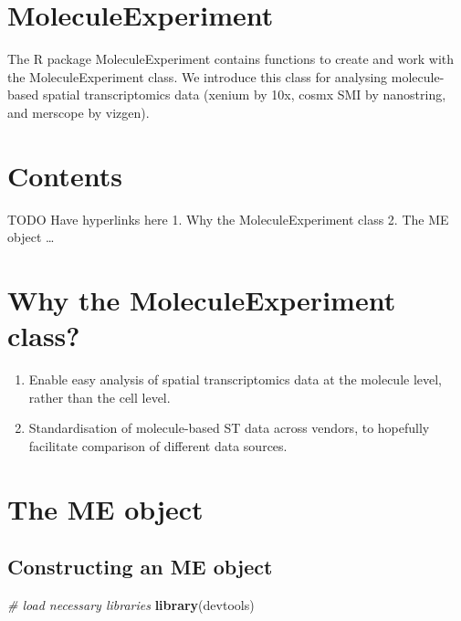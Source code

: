 \documentclass[
]{article}
\author{}
\date{\vspace{-2.5em}}
\newenvironment{Shaded}{\begin{snugshade}}{\end{snugshade}}
\newcommand{\CommentTok}[1]{\textcolor[rgb]{0.56,0.35,0.01}{\textit{#1}}}
\newcommand{\KeywordTok}[1]{\textcolor[rgb]{0.13,0.29,0.53}{\textbf{#1}}}
\newcommand{\NormalTok}[1]{#1}
\providecommand{\tightlist}{%
  \setlength{\itemsep}{0pt}\setlength{\parskip}{0pt}}
\begin{document}
\hypertarget{moleculeexperiment}{%
\section{MoleculeExperiment}\label{moleculeexperiment}}

The R package MoleculeExperiment contains functions to create and work
with the MoleculeExperiment class. We introduce this class for analysing
molecule-based spatial transcriptomics data (xenium by 10x, cosmx SMI by
nanostring, and merscope by vizgen).

\hypertarget{contents}{%
\section{Contents}\label{contents}}

TODO Have hyperlinks here 1. Why the MoleculeExperiment class 2. The ME
object \ldots{}

\hypertarget{why-the-moleculeexperiment-class}{%
\section{Why the MoleculeExperiment
class?}\label{why-the-moleculeexperiment-class}}

\begin{enumerate}
\def\labelenumi{\arabic{enumi})}
\tightlist
\item
  Enable easy analysis of spatial transcriptomics data at the molecule
  level, rather than the cell level.
\item
  Standardisation of molecule-based ST data across vendors, to hopefully
  facilitate comparison of different data sources.
\end{enumerate}

\hypertarget{the-me-object}{%
\section{The ME object}\label{the-me-object}}

\hypertarget{constructing-an-me-object}{%
\subsection{Constructing an ME object}\label{constructing-an-me-object}}

\begin{Shaded}
\begin{Highlighting}[]
\CommentTok{\# load necessary libraries}
\KeywordTok{library}\NormalTok{(devtools)}
\end{Highlighting}
\end{Shaded}
\end{document}
